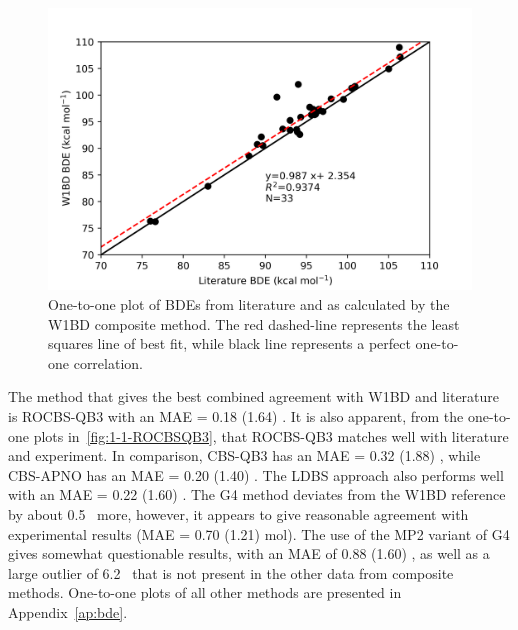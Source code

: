 \begin{figure}[H]
  \centering
  \includegraphics[width=\textwidth]{figures/lit-w1bd}
  \caption[One-to-one plot of BDEs from literature and as calculated by the W1BD composite method.]{One-to-one plot of BDEs from literature\protect\cite{Luo2002} and as calculated by the W1BD composite method. The red dashed-line represents the least squares line of best fit, while black line represents a perfect one-to-one correlation.}
  \label{fig:1-1-W1BD}
\end{figure}

The method that gives the best combined agreement with W1BD and literature is ROCBS-QB3 with an MAE = 0.18 (1.64) \kcalmol. It is also apparent, from the one-to-one plots in~\ref{fig:1-1-ROCBSQB3}, that ROCBS-QB3 matches well with literature and experiment. In comparison, CBS-QB3 has an MAE = 0.32 (1.88) \kcalmol, while CBS-APNO has an MAE = 0.20 (1.40) \kcalmol. The LDBS approach also performs well with an MAE = 0.22 (1.60) \kcalmol. The G4 method deviates from the W1BD reference by about 0.5 \kcalmol\ more, however, it appears to give reasonable agreement with experimental results (MAE = 0.70 (1.21) mol). The use of the MP2 variant of G4 gives somewhat questionable results, with an MAE of 0.88 (1.60) \kcalmol, as well as a large outlier of 6.2 \kcalmol\ that is not present in the other data from composite methods. One-to-one plots of all other methods are presented in Appendix~\ref{ap:bde}.


